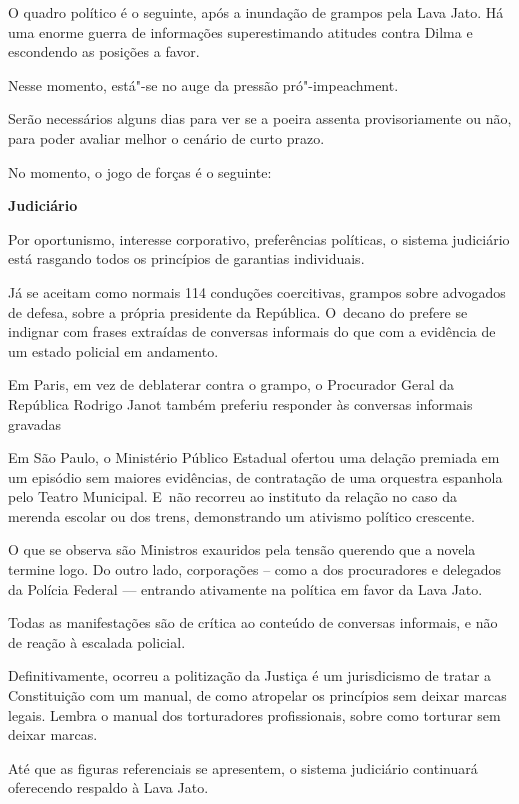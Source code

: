  

O quadro político é o seguinte, após a inundação de grampos pela Lava
Jato. Há uma enorme guerra de informações superestimando atitudes contra
Dilma e escondendo as posições a favor.

Nesse momento, está"-se no auge da pressão pró"-impeachment.

Serão necessários alguns dias para ver se a poeira assenta
provisoriamente ou não, para poder avaliar melhor o cenário de curto
prazo.

No momento, o jogo de forças é o seguinte:

\textbf{Judiciário}

Por oportunismo, interesse corporativo, preferências políticas, o
sistema judiciário está rasgando todos os princípios de garantias
individuais.

Já se aceitam como normais 114 conduções coercitivas, grampos sobre
advogados de defesa, sobre a própria presidente da República. O~decano
do  prefere se indignar com frases extraídas de conversas informais
do que com a evidência de um estado policial em andamento.

Em Paris, em vez de deblaterar contra o grampo, o Procurador Geral da
República Rodrigo Janot também preferiu responder às conversas informais
gravadas

Em São Paulo, o Ministério Público Estadual ofertou uma delação premiada
em um episódio sem maiores evidências, de contratação de uma orquestra
espanhola pelo Teatro Municipal. E~não recorreu ao instituto da relação
no caso da merenda escolar ou dos trens, demonstrando um ativismo
político crescente.

O que se observa são Ministros exauridos pela tensão querendo que a
novela termine logo. Do outro lado, corporações -- como a dos
procuradores e delegados da Polícia Federal --- entrando ativamente na
política em favor da Lava Jato.

Todas as manifestações são de crítica ao conteúdo de conversas
informais, e não de reação à escalada policial.

Definitivamente, ocorreu a politização da Justiça é um jurisdicismo de
tratar a Constituição com um manual, de como atropelar os princípios sem
deixar marcas legais. Lembra o manual dos torturadores profissionais,
sobre como torturar sem deixar marcas.

Até que as figuras referenciais se apresentem, o sistema judiciário
continuará oferecendo respaldo à Lava Jato.

